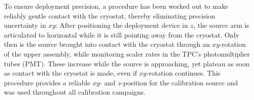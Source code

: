 To ensure deployment precision, a procedure has been worked out to make reliably gentle contact with the cryostat, thereby eliminating precision uncertainty in $xy$: After positioning the deployment device in $z$, the source arm is articulated to horizontal while it is still pointing away from the cryostat. Only then is the source brought into contact with the cryostat through an $xy$-rotation of the upper assembly, while monitoring scaler rates in the TPC's photomultiplier tubes (PMT).  These increase while the source is approaching, yet plateau as soon as contact with the cryostat is made, even if $xy$-rotation continues. This procedure provides a reliable $xy$- and $z$-position for the calibration source and was used throughout all calibration campaigns.